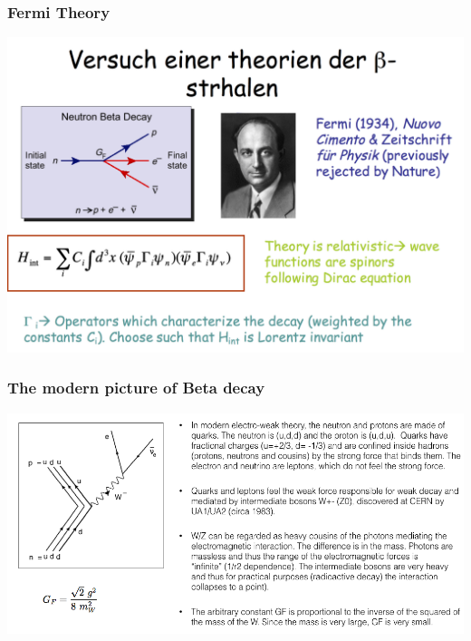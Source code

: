\begin{frame}
\frametitle{Fermi Theory}

\includegraphics[scale=0.3]{img/FermiTheory.png}

\end{frame}

\begin{frame}
\frametitle{The modern picture of Beta decay}

\includegraphics[scale=0.35]{img/BetaDecay.png}

\end{frame}